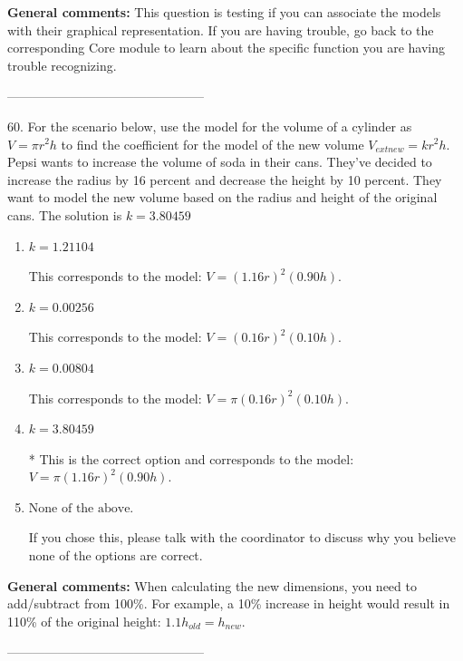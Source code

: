 \documentclass{extbook}[14pt]
\begin{document}
\textbf{General comments:} This question is testing if you can associate the models with their graphical representation. If you are having trouble, go back to the corresponding Core module to learn about the specific function you are having trouble recognizing.

-----------------------------------------------

60. For the scenario below, use the model for the volume of a cylinder as $V = \pi r^2 h$ to find the coefficient for the model of the new volume $V_{	ext{new}} = k r^2 h$.
Pepsi wants to increase the volume of soda in their cans. They've decided to increase the radius by 16 percent and decrease the height by 10 percent. They want to model the new volume based on the radius and height of the original cans. 
The solution is $ k = 3.80459 $ 

\begin{enumerate}[label=\Alph*.] 
\item $ k = 1.21104 $ 

 This corresponds to the model: $V = (1.16 r)^2 (0.90 h)$. 
\item $ k = 0.00256 $ 

 This corresponds to the model: $V = (0.16 r)^2 (0.10 h)$. 
\item $ k = 0.00804 $ 

 This corresponds to the model: $V = \pi (0.16 r)^2 (0.10 h)$. 
\item $ k = 3.80459 $ 

 * This is the correct option and corresponds to the model: $V = \pi (1.16 r)^2 (0.90 h)$. 
\item $ \text{None of the above.} $ 

 If you chose this, please talk with the coordinator to discuss why you believe none of the options are correct. 
\end{enumerate} 
 
\textbf{General comments:} When calculating the new dimensions, you need to add/subtract from 100\%. For example, a 10\% increase in height would result in 110\% of the original height: $1.1h_{old} = h_{new}$.

-----------------------------------------------
\end{document}
